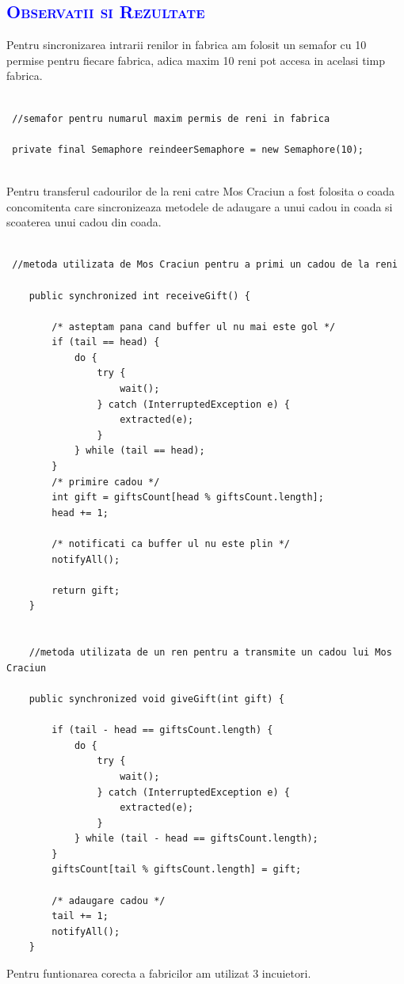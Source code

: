 \documentclass{article}
\begin{document}
\begin{center}
    \textcolor{blue}{\section{\bfseries\scshape\textcolor{blue}{Observatii si Rezultate}}}
\end{center}
\vspace{10mm}
Pentru sincronizarea intrarii renilor in fabrica am folosit un semafor cu 10 permise pentru fiecare fabrica, adica maxim 10 reni pot accesa in acelasi timp fabrica.\\
\begin{lstlisting}

 //semafor pentru numarul maxim permis de reni in fabrica
 
 private final Semaphore reindeerSemaphore = new Semaphore(10); 
 
\end{lstlisting}
\vspace{5mm}
Pentru transferul cadourilor de la reni catre Mos Craciun a fost folosita o coada concomitenta care sincronizeaza metodele de adaugare a unui cadou in coada si scoaterea unui cadou din coada.
\begin{lstlisting}

 //metoda utilizata de Mos Craciun pentru a primi un cadou de la reni
 
    public synchronized int receiveGift() {
    
        /* asteptam pana cand buffer ul nu mai este gol */
        if (tail == head) {
            do {
                try {
                    wait();
                } catch (InterruptedException e) {
                    extracted(e);
                }
            } while (tail == head);
        }
        /* primire cadou */
        int gift = giftsCount[head % giftsCount.length];
        head += 1;
        
        /* notificati ca buffer ul nu este plin */
        notifyAll();
        
        return gift;
    }


    //metoda utilizata de un ren pentru a transmite un cadou lui Mos Craciun
    
    public synchronized void giveGift(int gift) {
    
        if (tail - head == giftsCount.length) {
            do {
                try {
                    wait();
                } catch (InterruptedException e) {
                    extracted(e);
                }
            } while (tail - head == giftsCount.length);
        }
        giftsCount[tail % giftsCount.length] = gift;
        
        /* adaugare cadou */
        tail += 1;
        notifyAll();
    }
\end{lstlisting}
\vspace{5mm}
Pentru funtionarea corecta a fabricilor am utilizat 3 incuietori.\\\\
\end{document}
